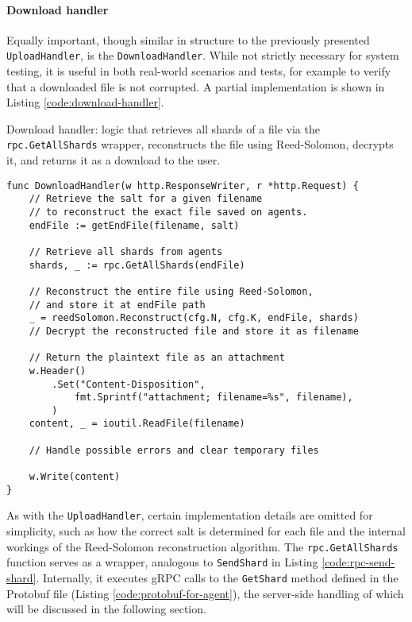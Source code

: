 \paragraph{Download handler}

Equally important, though similar in structure to the previously presented \texttt{UploadHandler}, is the \texttt{DownloadHandler}. While not strictly necessary for system testing, it is useful in both real-world scenarios and tests, for example to verify that a downloaded file is not corrupted. A partial implementation is shown in Listing \ref{code:download-handler}.

\begin{listing}
\caption{Download handler: logic that retrieves all shards of a file via the \texttt{rpc.GetAllShards} wrapper, reconstructs the file using Reed-Solomon, decrypts it, and returns it as a download to the user.}
\label{code:download-handler}
\begin{verbatim}
func DownloadHandler(w http.ResponseWriter, r *http.Request) {
    // Retrieve the salt for a given filename 
    // to reconstruct the exact file saved on agents.
    endFile := getEndFile(filename, salt)

    // Retrieve all shards from agents
    shards, _ := rpc.GetAllShards(endFile)

    // Reconstruct the entire file using Reed-Solomon,
    // and store it at endFile path
    _ = reedSolomon.Reconstruct(cfg.N, cfg.K, endFile, shards)
    // Decrypt the reconstructed file and store it as filename

    // Return the plaintext file as an attachment
    w.Header()
        .Set("Content-Disposition",
            fmt.Sprintf("attachment; filename=%s", filename),
        )
    content, _ = ioutil.ReadFile(filename)

    // Handle possible errors and clear temporary files

    w.Write(content)
}
\end{verbatim}
\end{listing}

As with the \texttt{UploadHandler}, certain implementation details are omitted for simplicity, such as how the correct salt is determined for each file and the internal workings of the Reed-Solomon reconstruction algorithm. The \texttt{rpc.GetAllShards} function serves as a wrapper, analogous to \texttt{SendShard} in Listing \ref{code:rpc-send-shard}. Internally, it executes gRPC calls to the \texttt{GetShard} method defined in the Protobuf file (Listing \ref{code:protobuf-for-agent}), the server-side handling of which will be discussed in the following section.

